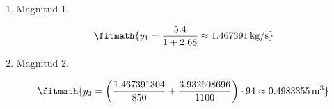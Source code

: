\begin{enumerate}

\item Magnitud 1.

\[\fitmath{y_{1}=\frac{5.4}{1+2.68}\approx 1.467391\,\mathrm{kg/s}}\]

\item Magnitud 2.

\[\fitmath{y_{2}=\left(\frac{1.467391304}{850}+\frac{3.932608696}{1100}\right)\cdot 94\approx 0.4983355\,\mathrm{m^{3}}}\]

\end{enumerate}
